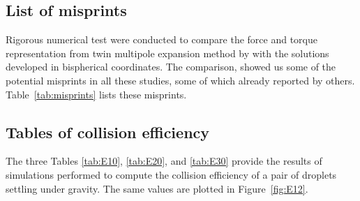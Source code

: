 \documentclass[../thesis.tex]{subfiles}
\begin{document}
\subsection{List of misprints}%
Rigorous numerical test were conducted to compare the force and torque representation from twin multipole expansion method by \cite{JO84} with the solutions developed in bispherical coordinates. The comparison, showed us some of the potential misprints in all these studies, some of which already reported by others. Table~\ref{tab:misprints} lists these misprints.



\subsection{Tables of collision efficiency\label{sec:E12}}

The three Tables \ref{tab:E10}, \ref{tab:E20}, and \ref{tab:E30} provide the results of simulations performed to compute the collision efficiency of a pair of droplets settling under gravity. The same values are plotted in Figure~\ref{fig:E12}.
\end{document}
